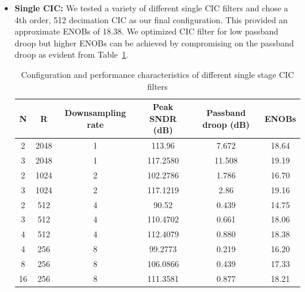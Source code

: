 \documentclass[11pt,onecolumn]{IEEEtran}
\begin{document}
\begin{itemize}
    \item \textbf{Single CIC:}
        We tested a variety of different single CIC filters and chose a 4th order, 512 decimation CIC as our final configuration. This provided an approximate ENOBs of 18.38. We optimized CIC filter for low passband droop but higher ENOBs can be achieved by compromising on the passband droop as evident from Table~\ref{tab:cic_sndr_comparison}.
        \begin{table}[h!]
        \centering
        \begin{tabular}{|c|c|c|c|c|c|}
        \hline
        \textbf{N} & {R} & \textbf{Downsampling rate} &
        \textbf{Peak SNDR (dB)} & \textbf{Passband droop (dB)} & \textbf{ENOBs} \\  \hline

        2 & 2048 & 1 & 113.96   & 7.672  & 18.64 \\  \hline
        3 & 2048 & 1 & 117.2580 & 11.508 & 19.19 \\ \hline

        2  & 1024 & 2 & 102.2786 & 1.786 & 16.70 \\ \hline
        3  & 1024 & 2 & 117.1219 & 2.86  & 19.16 \\ \hline
        2  & 512  & 4 & 90.52    & 0.439 & 14.75 \\ \hline
        3  & 512  & 4 & 110.4702 & 0.661 & 18.06 \\ \hline
        \rowcolor{green!25}
        4  & 512 & 4 & 112.4079 & 0.880 & 18.38 \\ \hline
        4  & 256  & 8 & 99.2773  & 0.219 & 16.20 \\ \hline
        8  & 256  & 8 & 106.0866 & 0.439 & 17.33 \\ \hline
        16 & 256  & 8 & 111.3581 & 0.877 & 18.21 \\ \hline
        \end{tabular}
        \caption{Configuration and performance characteristics of different single stage CIC filters}
        \label{tab:cic_sndr_comparison}
        \end{table}
        


\end{itemize}
\end{document}
